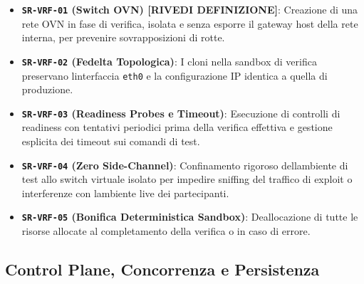 \begin{itemize}
\tightlist
\item
  \textbf{\passthrough{\lstinline!SR-VRF-01!} (Switch OVN) {[}RIVEDI
  DEFINIZIONE{]}}: Creazione di una rete OVN in fase di verifica,
  isolata e senza esporre il gateway host della rete interna, per
  prevenire sovrapposizioni di rotte.
\item
  \textbf{\passthrough{\lstinline!SR-VRF-02!} (Fedelta Topologica)}: I
  cloni nella sandbox di verifica preservano
  l\textquotesingle interfaccia \passthrough{\lstinline!eth0!} e la
  configurazione IP identica a quella di produzione.
\item
  \textbf{\passthrough{\lstinline!SR-VRF-03!} (Readiness Probes e
  Timeout)}: Esecuzione di controlli di readiness con tentativi
  periodici prima della verifica effettiva e gestione esplicita dei
  timeout sui comandi di test.
\item
  \textbf{\passthrough{\lstinline!SR-VRF-04!} (Zero Side-Channel)}:
  Confinamento rigoroso dell\textquotesingle ambiente di test allo
  switch virtuale isolato per impedire sniffing del traffico di exploit
  o interferenze con l\textquotesingle ambiente live dei partecipanti.
\item
  \textbf{\passthrough{\lstinline!SR-VRF-05!} (Bonifica Deterministica
  Sandbox)}: Deallocazione di tutte le risorse allocate al completamento
  della verifica o in caso di errore.
\end{itemize}

\subsection{Control Plane, Concorrenza e
Persistenza}\label{control-plane-concorrenza-e-persistenza}

